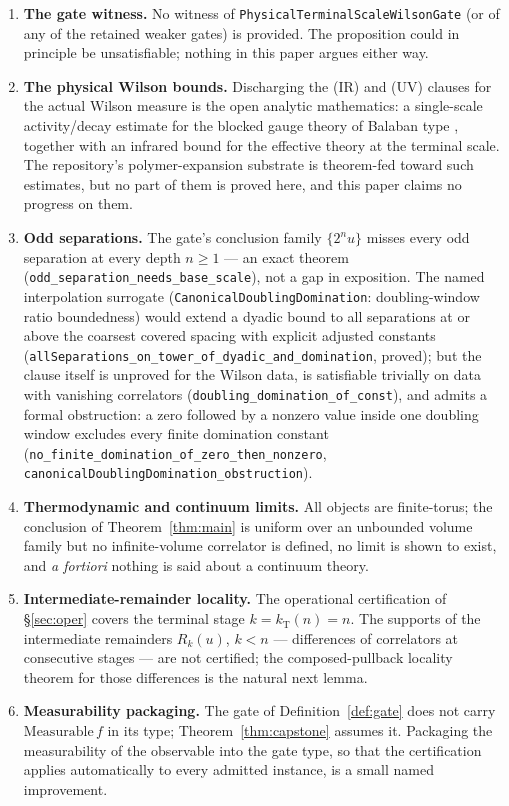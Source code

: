 \documentclass[11pt]{article}
\theoremstyle{definition}
\newcommand{\lean}[1]{\texttt{#1}}
\newcommand{\kT}{k_{\mathrm{T}}}
\begin{document}
\begin{enumerate}
\item \textbf{The gate witness.}  No witness of
\lean{PhysicalTerminalScaleWilsonGate} (or of any of the retained
weaker gates) is provided.  The proposition could in principle be
unsatisfiable; nothing in this paper argues either way.

\item \textbf{The physical Wilson bounds.}  Discharging the (IR) and
(UV) clauses for the actual Wilson measure is the open analytic
mathematics: a single-scale activity/decay estimate for the blocked
gauge theory of Balaban type
\cite{Bal87,Bal88a,Bal88b,Bal89,Dim13a,Dim13b,Dim14}, together with an
infrared bound for the effective theory at the terminal scale.  The
repository's polymer-expansion substrate \cite{ErikssonAL,ErikssonRT}
is theorem-fed toward such estimates, but no part of them is proved
here, and this paper claims no progress on them.

\item \textbf{Odd separations.}  The gate's conclusion family
$\{2^n u\}$ misses every odd separation at every depth $n \ge 1$ ---
an exact theorem (\lean{odd\_separation\_needs\_base\_scale}), not a
gap in exposition.  The named interpolation surrogate
(\lean{CanonicalDoublingDomination}: doubling-window ratio
boundedness) would extend a dyadic bound to all separations at or
above the coarsest covered spacing with explicit adjusted constants
(\lean{allSeparations\_on\_tower\_of\_dyadic\_and\_domination},
proved); but the clause itself is unproved for the Wilson data, is
satisfiable trivially on data with vanishing correlators
(\lean{doubling\_domination\_of\_const}), and admits a formal
obstruction: a zero followed by a nonzero value inside one doubling
window excludes every finite domination constant
(\lean{no\_finite\_domination\_of\_zero\_then\_nonzero},
\lean{canonicalDoublingDomination\_obstruction}).

\item \textbf{Thermodynamic and continuum limits.}  All objects are
finite-torus; the conclusion of Theorem~\ref{thm:main} is uniform over
an unbounded volume family but no infinite-volume correlator is
defined, no limit is shown to exist, and \emph{a fortiori} nothing is
said about a continuum theory.

\item \textbf{Intermediate-remainder locality.}  The operational
certification of \S\ref{sec:oper} covers the terminal stage
$k = \kT(n) = n$.  The supports of the intermediate remainders
$R_k(u)$, $k < n$ --- differences of correlators at consecutive
stages --- are not certified; the composed-pullback locality theorem
for those differences is the natural next lemma.

\item \textbf{Measurability packaging.}  The gate of
Definition~\ref{def:gate} does not carry $\mathrm{Measurable}\, f$ in
its type; Theorem~\ref{thm:capstone} assumes it.  Packaging the
measurability of the observable into the gate type, so that the
certification applies automatically to every admitted instance, is a
small named improvement.
\end{enumerate}
\end{document}
